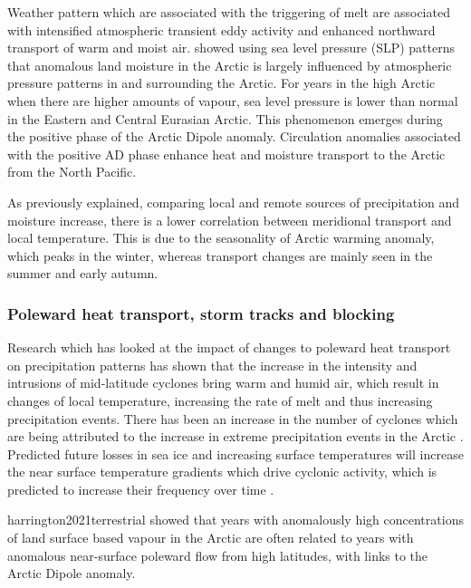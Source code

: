\documentclass[12pt, oneside]{article}
\begin{document}
Weather pattern which are associated with the triggering of melt are associated with intensified  atmospheric transient eddy activity and enhanced northward transport of warm and moist air\cite{dou2021trends}. 
\cite{harrington2021terrestrial} showed using sea level pressure (SLP) patterns that anomalous land moisture in the Arctic is largely influenced by atmospheric pressure patterns in and surrounding the Arctic. For years in the high Arctic when there are higher amounts of vapour, sea level pressure is lower than normal in the Eastern and Central Eurasian Arctic. This phenomenon emerges during the positive phase of the Arctic Dipole anomaly. Circulation anomalies associated with the positive AD phase enhance heat and moisture transport to the Arctic from the North Pacific\cite{harrington2021terrestrial}.

As previously explained, comparing local and remote sources of precipitation and moisture increase, there is a lower correlation between meridional transport and local temperature. This is due to the seasonality of Arctic warming anomaly, which peaks in the winter, whereas transport changes are mainly seen in the summer and early autumn. 





\subsubsection{Poleward heat transport, storm tracks and blocking}
Research which has looked at the impact of changes to poleward heat transport on precipitation patterns has shown that the increase in the intensity and intrusions of mid-latitude cyclones bring warm and humid air, which result in changes of local temperature, increasing the rate of melt and thus increasing precipitation events\cite{dou2022more}. There has been an increase in the number of cyclones which are being attributed to the increase in extreme precipitation events in the Arctic \cite{parker2022influence}. Predicted future losses in sea ice and increasing surface temperatures will increase the near surface temperature gradients which drive cyclonic activity, which is predicted to increase their frequency over time \cite{parker2022influence}.



{harrington2021terrestrial} showed that years with anomalously high concentrations of land surface based vapour in the Arctic are often related to years with anomalous near-surface poleward flow from high latitudes, with links to the Arctic Dipole anomaly.
\end{document}
